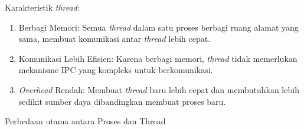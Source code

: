 \documentclass[12pt]{article}
\begin{document}
	            Karakteristik \textit{thread}:
	            \begin{enumerate}
		            \item Berbagi Memori: Semua \textit{thread} dalam satu proses berbagi ruang alamat yang sama, membuat komunikasi antar \textit{thread} lebih cepat.
		            \item Komunikasi Lebih Efisien: Karena berbagi memori, \textit{thread} tidak memerlukan mekanisme IPC yang kompleks untuk berkomunikasi.
		            \item \textit{Overhead} Rendah: Membuat \textit{thread} baru lebih cepat dan membutuhkan lebih sedikit sumber daya dibandingkan membuat proses baru.
	            \end{enumerate}
      \endenumerate
\item Perbedaan utama antara Proses dan Thread
\end{document}
